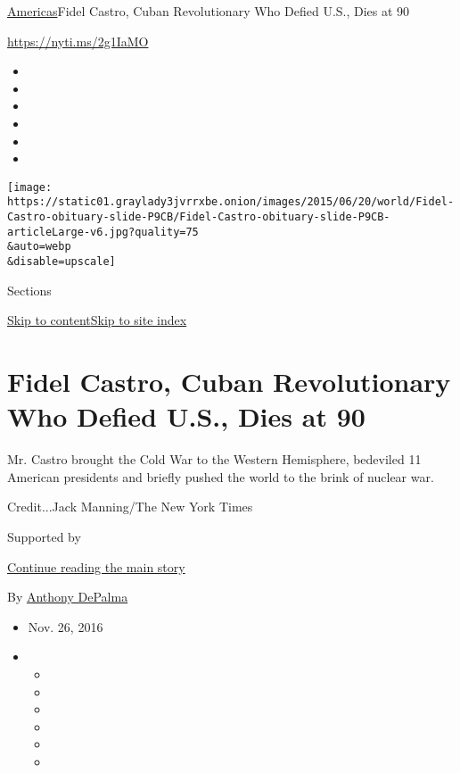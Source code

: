 \href{/section/world/americas}{Americas}\textbar{}Fidel Castro, Cuban
Revolutionary Who Defied U.S., Dies at 90

\url{https://nyti.ms/2g1IaMO}

\begin{itemize}
\item
\item
\item
\item
\item
\item
\end{itemize}

\texttt{[image: https://static01.graylady3jvrrxbe.onion/images/2015/06/20/world/Fidel-Castro-obituary-slide-P9CB/Fidel-Castro-obituary-slide-P9CB-articleLarge-v6.jpg?quality=75\\\&auto=webp\\\&disable=upscale]}

Sections

\protect\hyperlink{site-content}{Skip to
content}\protect\hyperlink{site-index}{Skip to site index}

\hypertarget{fidel-castro-cuban-revolutionary-who-defied-us-dies-at-90}{%
\section{Fidel Castro, Cuban Revolutionary Who Defied U.S., Dies at
90}\label{fidel-castro-cuban-revolutionary-who-defied-us-dies-at-90}}

Mr. Castro brought the Cold War to the Western Hemisphere, bedeviled 11
American presidents and briefly pushed the world to the brink of nuclear
war.

Credit...Jack Manning/The New York Times

Supported by

\protect\hyperlink{after-sponsor}{Continue reading the main story}

By \href{http://www.nytimes3xbfgragh.onion/by/anthony-depalma}{Anthony
DePalma}

\begin{itemize}
\item
  Nov. 26, 2016
\item
  \begin{itemize}
  \item
  \item
  \item
  \item
  \item
  \item
  \end{itemize}
\end{itemize}

